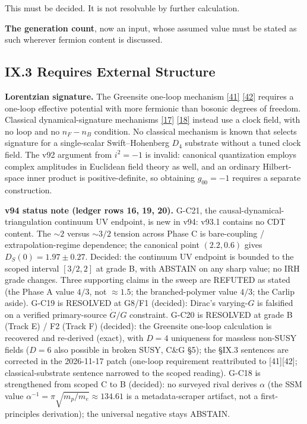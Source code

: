\documentclass[a4paper,11pt]{article}
\begin{document}
This must be decided. It is not resolvable by further calculation.

\textbf{The generation count}, now an input, whose assumed value must be stated as such wherever fermion content is discussed.

\subsection*{IX.3 Requires External Structure}

\textbf{Lorentzian signature.} The Greensite one-loop mechanism \hyperref[ref41]{[41]} \hyperref[ref42]{[42]} requires a one-loop effective potential with more fermionic than bosonic degrees of freedom. Classical dynamical-signature mechanisms \hyperref[ref17]{[17]} \hyperref[ref18]{[18]} instead use a clock field, with no loop and no $n_F-n_B$ condition. No classical mechanism is known that selects signature for a single-scalar Swift–Hohenberg $D_4$ substrate without a tuned clock field. The v92 argument from $i^2=-1$ is invalid: canonical quantization employs complex amplitudes in Euclidean field theory as well, and an ordinary Hilbert-space inner product is positive-definite, so obtaining $g_{00}=-1$ requires a separate construction.

\textbf{v94 status note (ledger rows 16, 19, 20).} G-C21, the causal-dynamical-triangulation continuum UV endpoint, is new in v94: v93.1 contains no CDT content. The $\sim2$ versus $\sim3/2$ tension across Phase C is bare-coupling / extrapolation-regime dependence; the canonical point $(2.2,0.6)$ gives $D_S(0)=1.97\pm0.27$. Decided: the continuum UV endpoint is bounded to the scoped interval $[3/2,2]$ at grade B, with ABSTAIN on any sharp value; no IRH grade changes. Three supporting claims in the sweep are REFUTED as stated (the Phase A value $4/3$, not $\approx1.5$; the branched-polymer value $4/3$; the Carlip aside). G-C19 is RESOLVED at G8/F1 (decided): Dirac's varying-$G$ is falsified on a verified primary-source $\dot{G}/G$ constraint. G-C20 is RESOLVED at grade B (Track E) / F2 (Track F) (decided): the Greensite one-loop calculation is recovered and re-derived (exact), with $D=4$ uniqueness for massless non-SUSY fields ($D=6$ also possible in broken SUSY, C\&G \S5); the \S IX.3 sentences are corrected in the 2026-11-17 patch (one-loop requirement reattributed to [41][42]; classical-substrate sentence narrowed to the scoped reading). G-C18 is strengthened from scoped C to B (decided): no surveyed rival derives $\alpha$ (the SSM value $\alpha^{-1}=\pi\sqrt{m_p/m_e}\approx134.61$ is a metadata-scraper artifact, not a first-principles derivation); the universal negative stays ABSTAIN.
\end{document}

